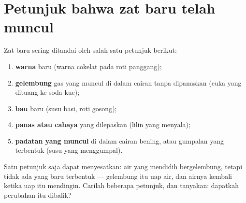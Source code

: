 \section{Petunjuk bahwa zat baru telah muncul}

\begin{method}\label{met:g5:irreversible-changes:clues}
Zat baru sering ditandai oleh salah satu petunjuk berikut:
\begin{enumerate}
  \item \textbf{warna} baru (warna cokelat pada roti panggang);
  \item \textbf{gelembung} gas yang muncul di dalam cairan tanpa
        dipanaskan (cuka yang dituang ke soda kue);
  \item \textbf{bau} baru (susu basi, roti gosong);
  \item \textbf{panas atau cahaya} yang dilepaskan (lilin yang
        menyala);
  \item \textbf{padatan yang muncul} di dalam cairan bening, atau
        gumpalan yang terbentuk (susu yang menggumpal).
\end{enumerate}
Satu petunjuk saja dapat menyesatkan: air yang mendidih bergelembung,
tetapi tidak ada yang baru terbentuk --- gelembung itu uap air, dan
airnya kembali ketika uap itu mendingin. Carilah beberapa petunjuk, dan
tanyakan: dapatkah perubahan itu dibalik?
\end{method}

